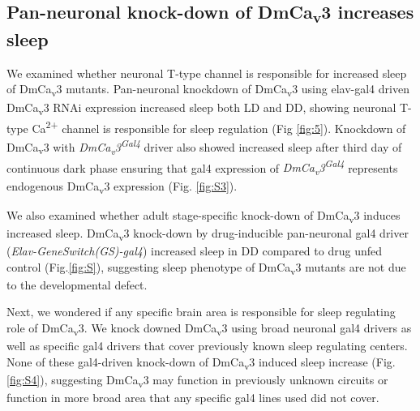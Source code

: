 \subsection*{Pan-neuronal knock-down of DmCa\textsubscript{v}3 increases sleep}

We examined whether neuronal T-type channel is responsible for increased sleep of DmCa\textsubscript{v}3 mutants.
Pan-neuronal knockdown of DmCa\textsubscript{v}3 using elav-gal4 driven DmCa\textsubscript{v}3 RNAi expression increased sleep both LD and DD, showing neuronal T-type Ca\textsuperscript{2+} channel is responsible for sleep regulation (Fig \ref{fig:5}).
Knockdown of DmCa\textsubscript{v}3 with \emph{DmCa\textsubscript{v}3\textsuperscript{Gal4}} driver also showed increased sleep after third day of continuous dark phase ensuring that gal4 expression of \emph{DmCa\textsubscript{v}3\textsuperscript{Gal4}} represents endogenous DmCa\textsubscript{v}3 expression (Fig. \ref{fig:S3}).

We also examined whether adult stage-specific knock-down of DmCa\textsubscript{v}3 induces increased sleep.
DmCa\textsubscript{v}3 knock-down by drug-inducible pan-neuronal gal4 driver (\emph{Elav-GeneSwitch(GS)-gal4}) increased sleep in DD compared to drug unfed control (Fig.\ref{fig:S}), suggesting sleep phenotype of DmCa\textsubscript{v}3 mutants are not due to the developmental defect.


Next, we wondered if any specific brain area is responsible for sleep regulating role of DmCa\textsubscript{v}3.
We knock downed DmCa\textsubscript{v}3 using broad neuronal gal4 drivers as well as specific gal4 drivers that cover previously known sleep regulating centers.
None of these gal4-driven knock-down of DmCa\textsubscript{v}3 induced sleep increase (Fig. \ref{fig:S4}), suggesting DmCa\textsubscript{v}3 may function in previously unknown circuits or function in more broad area that any specific gal4 lines used did not cover.  
    
  
  
  
  